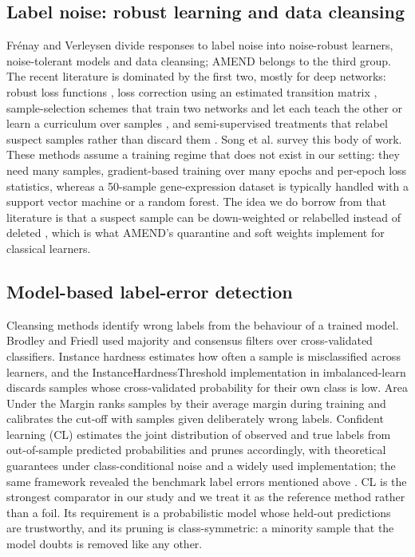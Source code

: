 \documentclass[conference]{IEEEtran}
\begin{document}
\subsection{Label noise: robust learning and data cleansing}\label{sec:label-noise-robust-learning-and-data-cleansing}

Frénay and Verleysen \cite{frenay2014} divide responses to label noise into noise-robust learners, noise-tolerant models and data cleansing; AMEND belongs to the third group. The recent literature is dominated by the first two, mostly for deep networks: robust loss functions \cite{ghosh2017,zhang2018}, loss correction using an estimated transition matrix \cite{patrini2017}, sample-selection schemes that train two networks and let each teach the other \cite{han2018} or learn a curriculum over samples \cite{jiang2018}, and semi-supervised treatments that relabel suspect samples rather than discard them \cite{li2020}. Song et al. \cite{song2023} survey this body of work. These methods assume a training regime that does not exist in our setting: they need many samples, gradient-based training over many epochs and per-epoch loss statistics, whereas a 50-sample gene-expression dataset is typically handled with a support vector machine or a random forest. The idea we do borrow from that literature is that a suspect sample can be down-weighted or relabelled instead of deleted \cite{li2020}, which is what AMEND's quarantine and soft weights implement for classical learners.

\subsection{Model-based label-error detection}\label{sec:model-based-label-error-detection}

Cleansing methods identify wrong labels from the behaviour of a trained model. Brodley and Friedl \cite{brodley1999} used majority and consensus filters over cross-validated classifiers. Instance hardness \cite{smith2014} estimates how often a sample is misclassified across learners, and the InstanceHardnessThreshold implementation in imbalanced-learn \cite{lemaitre2017} discards samples whose cross-validated probability for their own class is low. Area Under the Margin \cite{pleiss2020} ranks samples by their average margin during training and calibrates the cut-off with samples given deliberately wrong labels. Confident learning (CL) \cite{northcutt2021confident} estimates the joint distribution of observed and true labels from out-of-sample predicted probabilities and prunes accordingly, with theoretical guarantees under class-conditional noise and a widely used implementation; the same framework revealed the benchmark label errors mentioned above \cite{northcutt2021pervasive}. CL is the strongest comparator in our study and we treat it as the reference method rather than a foil. Its requirement is a probabilistic model whose held-out predictions are trustworthy, and its pruning is class-symmetric: a minority sample that the model doubts is removed like any other.
\end{document}
